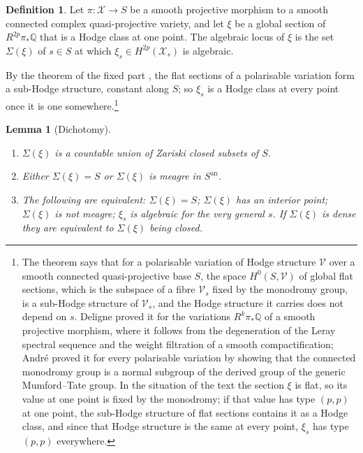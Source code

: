 \documentclass[11pt,reqno]{amsart}
\numberwithin{equation}{section}
\theoremstyle{plain}
\newtheorem{lemma}[theorem]{Lemma}
\theoremstyle{definition}
\newtheorem{definition}[theorem]{Definition}
\newcommand{\QQ}{\mathbb{Q}}
\begin{document}
\begin{definition}\label{def:algloc}
Let $\pi\colon\mathcal{X}\to S$ be a smooth projective morphism to a smooth connected complex quasi-projective variety, and let $\xi$ be a global section of $R^{2p}\pi_{*}\QQ$ that is a Hodge class at one point. The algebraic locus of $\xi$ is the set $\Sigma(\xi)$ of $s\in S$ at which $\xi_{s}\in H^{2p}(\mathcal{X}_{s})$ is algebraic.
\end{definition}

By the theorem of the fixed part \cite{Del71,And92}, the flat sections of a polarisable variation form a sub-Hodge structure, constant along $S$; so $\xi_{s}$ is a Hodge class at every point once it is one somewhere.\footnote{The theorem says that for a polarisable variation of Hodge structure $\mathcal{V}$ over a smooth connected quasi-projective base $S$, the space $H^{0}(S,\mathcal{V})$ of global flat sections, which is the subspace of a fibre $\mathcal{V}_{s}$ fixed by the monodromy group, is a sub-Hodge structure of $\mathcal{V}_{s}$, and the Hodge structure it carries does not depend on $s$. Deligne proved it for the variations $R^{k}\pi_{*}\QQ$ of a smooth projective morphism, where it follows from the degeneration of the Leray spectral sequence and the weight filtration of a smooth compactification; Andr\'e proved it for every polarisable variation by showing that the connected monodromy group is a normal subgroup of the derived group of the generic Mumford--Tate group. In the situation of the text the section $\xi$ is flat, so its value at one point is fixed by the monodromy; if that value has type $(p,p)$ at one point, the sub-Hodge structure of flat sections contains it as a Hodge class, and since that Hodge structure is the same at every point, $\xi_{s}$ has type $(p,p)$ everywhere.}

\begin{lemma}[Dichotomy]\label{lem:dichotomy}
\leavevmode
\begin{enumerate}[label=\textup{(\roman*)},leftmargin=2.4em,itemsep=2pt]
\item $\Sigma(\xi)$ is a countable union of Zariski closed subsets of $S$.
\item Either $\Sigma(\xi)=S$ or $\Sigma(\xi)$ is meagre in $S^{\mathrm{an}}$.
\item The following are equivalent: $\Sigma(\xi)=S$; $\Sigma(\xi)$ has an interior point; $\Sigma(\xi)$ is not meagre; $\xi_{s}$ is algebraic for the very general $s$. If $\Sigma(\xi)$ is dense they are equivalent to $\Sigma(\xi)$ being closed.
\end{enumerate}
\end{lemma}
\end{document}
